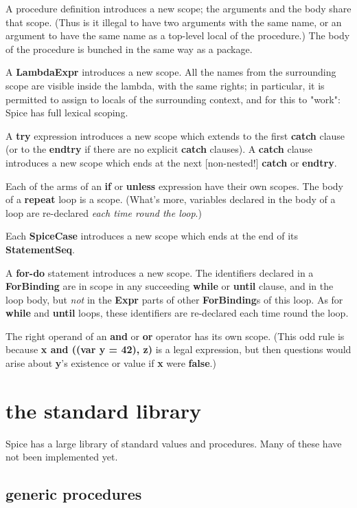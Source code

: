 \documentclass{report}
\begin{document}
A procedure definition introduces a new scope; the arguments and the body
share that scope. (Thus is it illegal to have two arguments with the same
name, or an argument to have the same name as a top-level local of the
procedure.) The body of the procedure is bunched in the same way as a package.

A {\bf LambdaExpr} introduces a new scope. All the names from the surrounding
scope are visible inside the lambda, with the same rights; in particular,
it is permitted to assign to locals of the surrounding context, and for this
to "work": Spice has full lexical scoping.

A {\bf try} expression introduces a new scope which extends to the first {\bf catch}
clause (or to the {\bf endtry} if there are no explicit {\bf catch} clauses). A
{\bf catch} clause introduces a new scope which ends at the next {[}non-nested!{]}
{\bf catch} or {\bf endtry}.

Each of the arms of an {\bf if} or {\bf unless} expression have their own scopes. The
body of a {\bf repeat} loop is a scope. (What's more, variables declared
in the body of a loop are re-declared {\em each time round the loop}.)

Each {\bf SpiceCase} introduces a new scope which ends at the end of its
{\bf StatementSeq}.

A {\bf for-do} statement introduces a new scope. The identifiers declared in
a {\bf ForBinding} are in scope in any succeeding {\bf while} or {\bf until} clause, and
in the loop body, but {\em not} in the {\bf Expr} parts of other {\bf ForBinding}s of this
loop. As for {\bf while} and {\bf until} loops, these identifiers are re-declared
each time round the loop.

The right operand of an {\bf and} or {\bf or} operator has its own scope. (This odd
rule is because {\bf x and ((var y = 42), z)} is a legal expression, but then
questions would arise about {\bf y}'s existence or value if {\bf x} were {\bf false}.)\chapter{the standard library}


Spice has a large library of standard values and procedures. Many of these
have not been implemented yet.

\section{generic procedures}
\end{document}
